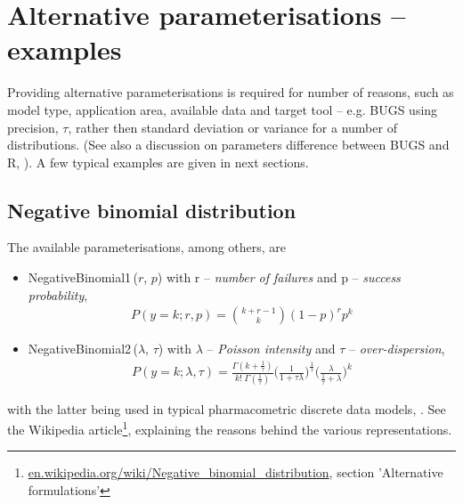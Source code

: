 \section{Alternative parameterisations -- examples}
Providing alternative parameterisations is required for number of reasons, such as
model type, application area, available data and target tool -- e.g. BUGS using 
precision, $\tau$, rather then standard deviation or variance for a number of 
distributions. (See also a discussion on parameters difference between BUGS
and R, \cite{lebauer2013translating}). A few typical examples are given in next sections.

\subsection{Negative binomial distribution} 
The available parameterisations, among others, are
\begin{itemize}
\item
NegativeBinomial1\,($r$, $p$) with r -- \emph{number of failures} and p -- \emph{success probability},
\begin{align}
P(y=k;r,p) = \binom {k+r-1}k (1-p)^r p^k \nonumber
\end{align}
\item
NegativeBinomial2\,($\lambda$, $\tau$) with $\lambda$ -- \emph{Poisson intensity} and $\tau$ -- \emph{over-dispersion},
\begin{align}
P(y=k;\lambda,\tau) = \frac{\Gamma(k + \frac{1}{\tau})}{k!\; \Gamma(\frac{1}{\tau})} \Big(\frac{1}{1+\tau \lambda} \Big)^{\frac{1}{\tau}} 
\Big(\frac{\lambda}{\frac{1}{\tau} + \lambda} \Big)^{k} \nonumber
\end{align}
\end{itemize}
with the latter being used in typical pharmacometric discrete data models, \cite{Plan:2009fk, Troconiz:2009fv}.
See the Wikipedia article\footnote{\url{en.wikipedia.org/wiki/Negative_binomial_distribution}, 
section 'Alternative formulations'}, explaining the reasons behind the various representations.

